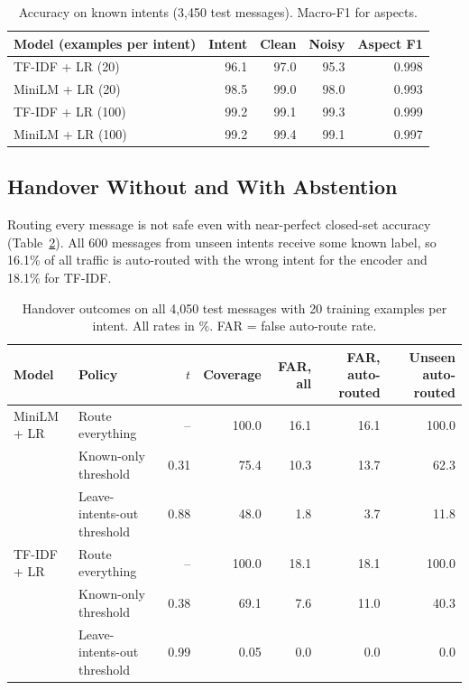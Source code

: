 \documentclass{icaiit2027}
\begin{document}
\begin{table}[t]
  \caption{Accuracy on known intents (3,450 test messages). Macro-F1 for aspects.}
  \label{tab:acc}
  \centering\footnotesize
  \setlength{\tabcolsep}{4pt}
  \begin{tabularx}{\columnwidth}{@{}X r r r r@{}}
    \toprule
    Model (examples per intent) & Intent & Clean & Noisy & Aspect F1 \\
    \midrule
    TF-IDF + LR (20) & 96.1 & 97.0 & 95.3 & 0.998 \\
    MiniLM + LR (20) & 98.5 & 99.0 & 98.0 & 0.993 \\
    TF-IDF + LR (100) & 99.2 & 99.1 & 99.3 & 0.999 \\
    MiniLM + LR (100) & 99.2 & 99.4 & 99.1 & 0.997 \\
    \bottomrule
  \end{tabularx}
\end{table}

\subsection{Handover Without and With Abstention}

Routing every message is not safe even with near-perfect closed-set accuracy (Table~\ref{tab:handover}). All 600 messages from unseen intents receive some known label, so 16.1\% of all traffic is auto-routed with the wrong intent for the encoder and 18.1\% for TF-IDF.

\begin{table}[t]
  \caption{Handover outcomes on all 4,050 test messages with 20 training examples per intent. All rates in \%. FAR = false auto-route rate.}
  \label{tab:handover}
  \centering\footnotesize
  \begin{tabular}{@{}l l r r r r r@{}}
    \toprule
    Model & Policy & $t$ & Coverage & FAR, all & FAR, auto-routed & Unseen auto-routed \\
    \midrule
    MiniLM + LR & Route everything & -- & 100.0 & 16.1 & 16.1 & 100.0 \\
     & Known-only threshold & 0.31 & 75.4 & 10.3 & 13.7 & 62.3 \\
     & Leave-intents-out threshold & 0.88 & 48.0 & 1.8 & 3.7 & 11.8 \\
    \midrule
    TF-IDF + LR & Route everything & -- & 100.0 & 18.1 & 18.1 & 100.0 \\
     & Known-only threshold & 0.38 & 69.1 & 7.6 & 11.0 & 40.3 \\
     & Leave-intents-out threshold & 0.99 & 0.05 & 0.0 & 0.0 & 0.0 \\
    \bottomrule
  \end{tabular}
\end{table}
\end{document}
